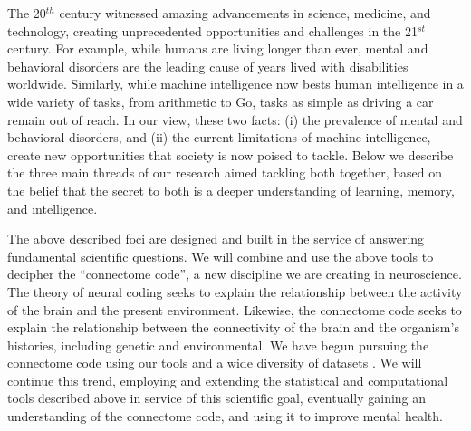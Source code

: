 \documentclass[11pt]{article}
\title{\vspace{-85pt} {\large \bb{Research Statement
, Joshua T.~Vogelstein}
}
}
\date{}
\renewcommand{\para}[1]{\vspace{-10pt}\fontsize{10pt}{0pt}\paragraph{#1}}
\begin{document}

\maketitle


The 20$^{th}$ century witnessed amazing advancements in science, medicine, and technology, creating  unprecedented opportunities and challenges in the 21$^{st}$ century.  For example, while humans are living longer than ever, mental and behavioral disorders are the leading cause of years lived with disabilities worldwide. Similarly, while machine intelligence now bests human intelligence in a wide variety of tasks, from arithmetic to Go, tasks as simple as driving a car remain  out of reach. In our view, these two facts: (i) the prevalence of mental and behavioral disorders, and (ii) the current limitations of machine intelligence, create new opportunities that society is now poised to tackle. 
Below we describe the three main threads of our research aimed tackling both together, based on the belief that  the secret to both is a deeper understanding of learning, memory, and intelligence.


The above described foci are designed and built in the service of answering fundamental scientific questions.
We will combine and use the above tools to decipher the ``connectome code'', a new discipline we are creating in neuroscience.  The theory of neural coding seeks to explain the relationship between the activity of the brain and the present environment.  Likewise, the connectome code seeks to explain the relationship between the connectivity of the brain and the organism's histories, including genetic and environmental. We have begun pursuing the connectome code using our tools and a wide diversity of datasets  \cite{Hofer2011b, Craddock2013c, Airan15a, marta, Kasthuri15a}. We will continue this trend, employing and extending the statistical and computational tools described above in service of this scientific goal, eventually gaining an understanding of the connectome code, and using it to improve mental health.
\end{document}
